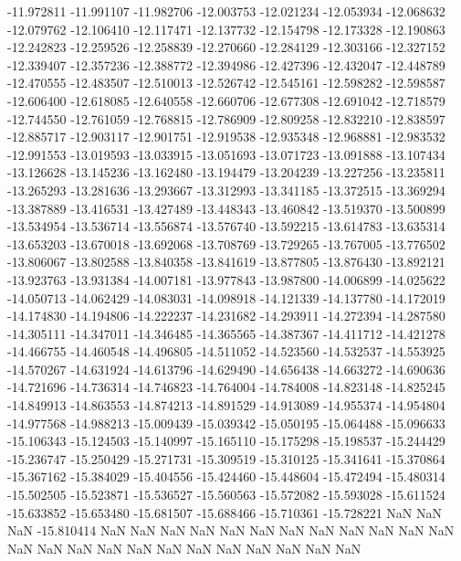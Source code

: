 -11.972811
-11.991107
-11.982706
-12.003753
-12.021234
-12.053934
-12.068632
-12.079762
-12.106410
-12.117471
-12.137732
-12.154798
-12.173328
-12.190863
-12.242823
-12.259526
-12.258839
-12.270660
-12.284129
-12.303166
-12.327152
-12.339407
-12.357236
-12.388772
-12.394986
-12.427396
-12.432047
-12.448789
-12.470555
-12.483507
-12.510013
-12.526742
-12.545161
-12.598282
-12.598587
-12.606400
-12.618085
-12.640558
-12.660706
-12.677308
-12.691042
-12.718579
-12.744550
-12.761059
-12.768815
-12.786909
-12.809258
-12.832210
-12.838597
-12.885717
-12.903117
-12.901751
-12.919538
-12.935348
-12.968881
-12.983532
-12.991553
-13.019593
-13.033915
-13.051693
-13.071723
-13.091888
-13.107434
-13.126628
-13.145236
-13.162480
-13.194479
-13.204239
-13.227256
-13.235811
-13.265293
-13.281636
-13.293667
-13.312993
-13.341185
-13.372515
-13.369294
-13.387889
-13.416531
-13.427489
-13.448343
-13.460842
-13.519370
-13.500899
-13.534954
-13.536714
-13.556874
-13.576740
-13.592215
-13.614783
-13.635314
-13.653203
-13.670018
-13.692068
-13.708769
-13.729265
-13.767005
-13.776502
-13.806067
-13.802588
-13.840358
-13.841619
-13.877805
-13.876430
-13.892121
-13.923763
-13.931384
-14.007181
-13.977843
-13.987800
-14.006899
-14.025622
-14.050713
-14.062429
-14.083031
-14.098918
-14.121339
-14.137780
-14.172019
-14.174830
-14.194806
-14.222237
-14.231682
-14.293911
-14.272394
-14.287580
-14.305111
-14.347011
-14.346485
-14.365565
-14.387367
-14.411712
-14.421278
-14.466755
-14.460548
-14.496805
-14.511052
-14.523560
-14.532537
-14.553925
-14.570267
-14.631924
-14.613796
-14.629490
-14.656438
-14.663272
-14.690636
-14.721696
-14.736314
-14.746823
-14.764004
-14.784008
-14.823148
-14.825245
-14.849913
-14.863553
-14.874213
-14.891529
-14.913089
-14.955374
-14.954804
-14.977568
-14.988213
-15.009439
-15.039342
-15.050195
-15.064488
-15.096633
-15.106343
-15.124503
-15.140997
-15.165110
-15.175298
-15.198537
-15.244429
-15.236747
-15.250429
-15.271731
-15.309519
-15.310125
-15.341641
-15.370864
-15.367162
-15.384029
-15.404556
-15.424460
-15.448604
-15.472494
-15.480314
-15.502505
-15.523871
-15.536527
-15.560563
-15.572082
-15.593028
-15.611524
-15.633852
-15.653480
-15.681507
-15.688466
-15.710361
-15.728221
NaN
NaN
NaN
-15.810414
NaN
NaN
NaN
NaN
NaN
NaN
NaN
NaN
NaN
NaN
NaN
NaN
NaN
NaN
NaN
NaN
NaN
NaN
NaN
NaN
NaN
NaN
NaN
NaN
